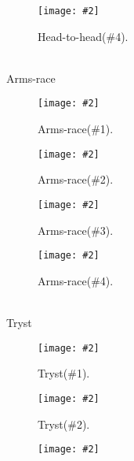 \documentclass[11pt]{article}
\newcommand{\addFigure}[2]{\texttt{[image: \#2]}}
\newcommand{\Tryst}{Tryst\xspace}
\newcommand{\Armsrace}{Arms-race\xspace}
\newcommand{\Headtohead}{Head-to-head\xspace}
\begin{document}
\begin{figure*}[htb!]
\begin{subfigure}[t]{0.22\textwidth}
        \end{subfigure}
        \hfill
        \begin{subfigure}[t]{0.22\textwidth}
            \addFigure{\textwidth}{{figure/immigration_topics_head-to-head_chinese,immigra_immigrant,immig}.pdf}
            \caption{\Headtohead (\#4).}
        \end{subfigure}\\
        {\large \textcolor{armsracecolor}{\Armsrace}}\\
        \begin{subfigure}[t]{0.22\textwidth}
            \addFigure{\textwidth}{{figure/immigration_topics_arms-race_immigration,imm_republican,immi}.pdf}
            \caption{\Armsrace (\#1).}
        \end{subfigure}
        \hfill
        \begin{subfigure}[t]{0.22\textwidth}
            \addFigure{\textwidth}{{figure/immigration_topics_arms-race_immigration,imm_republican,perc}.pdf}
            \caption{\Armsrace (\#2).}
        \end{subfigure}
        \hfill
        \begin{subfigure}[t]{0.22\textwidth}
            \addFigure{\textwidth}{{figure/immigration_topics_arms-race_county,immigran_immigrant,immig}.pdf}
            \caption{\Armsrace (\#3).}
        \end{subfigure}
        \hfill
        \begin{subfigure}[t]{0.22\textwidth}
            \addFigure{\textwidth}{{figure/immigration_topics_arms-race_worker,job,labo_detainee,church}.pdf}
            \caption{\Armsrace (\#4).}
        \end{subfigure}\\
        {\large \textcolor{trystcolor}{\Tryst}}\\
        \begin{subfigure}[t]{0.22\textwidth}
            \addFigure{\textwidth}{{figure/immigration_topics_tryst_immigration,imm_immigration,cas}.pdf}
            \caption{\Tryst (\#1).}
        \end{subfigure}
        \hfill
        \begin{subfigure}[t]{0.22\textwidth}
            \addFigure{\textwidth}{{figure/immigration_topics_tryst_immigration,imm_detainee,church}.pdf}
            \caption{\Tryst (\#2).}
        \end{subfigure}
        \hfill
        \begin{subfigure}[t]{0.22\textwidth}
            \addFigure{\textwidth}{{figure/immigration_topics_tryst_child,immigrant_immigration,cas}.pdf}

\end{subfigure}
\end{figure*}
\end{document}
